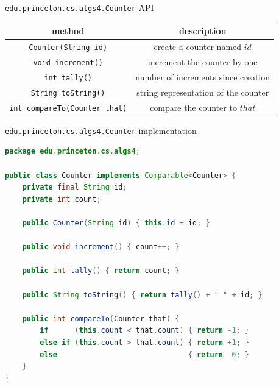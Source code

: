 \documentclass[8pt,a4paper,compress]{beamer}
\begin{document}
\begin{frame}[fragile]
\pause

\lstinline{edu.princeton.cs.algs4.Counter} API
\begin{center}
\begin{tabular}{cc}
method & description \\ \hline
\lstinline$Counter(String id)$ & create a counter named $id$ \\
\lstinline$void increment()$ & increment the counter by one \\
\lstinline$int tally()$ & number of increments since creation \\
\lstinline$String toString()$ & string representation of the counter \\
\lstinline$int compareTo(Counter that)$ & compare the counter to $that$
\end{tabular} 
\end{center}

\pause

\lstinline{edu.princeton.cs.algs4.Counter} implementation
\begin{lstlisting}[language=Java]
package edu.princeton.cs.algs4;

public class Counter implements Comparable<Counter> {
    private final String id;
    private int count;

    public Counter(String id) { this.id = id; }

    public void increment() { count++; }

    public int tally() { return count; }

    public String toString() { return tally() + " " + id; }
    
    public int compareTo(Counter that) {
        if      (this.count < that.count) { return -1; }
        else if (this.count > that.count) { return +1; }
        else                              { return  0; }
    }
}
\end{lstlisting}
\end{frame}
\end{document}
